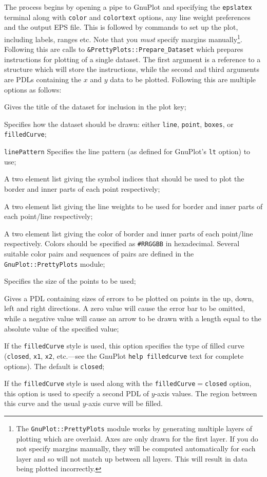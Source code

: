 The process begins by opening a pipe to {\sc GnuPlot} and specifying the {\tt epslatex} terminal along with {\tt color} and {\tt colortext} options, any line weight preferences and the output EPS file. This is followed by commands to set up the plot, including labels, ranges etc. Note that you \emph{must} specify margins manually\footnote{The {\tt GnuPlot::PrettyPlots} module works by generating multiple layers of plotting which are overlaid. Axes are only drawn for the first layer. If you do not specify margins manually, they will be computed automatically for each layer and so will not match up between all layers. This will result in data being plotted incorrectly.}. Following this are calls to {\tt \&PrettyPlots::Prepare\_Dataset} which prepares instructions for plotting of a single dataset. The first argument is a reference to a structure which will store the instructions, while the second and third arguments are PDLs containing the $x$ and $y$ data to be plotted. Following this are multiple options as follows:
\begin{description}
\item[{\tt title}] Gives the title of the dataset for inclusion in the plot key;
\item[{\tt style}] Specifies how the dataset should be drawn: either {\tt line}, {\tt point}, {\tt boxes}, or {\tt filledCurve};
\item{{\tt linePattern}} Specifies the line pattern (as defined for {\sc GnuPlot}'s {\tt lt} option) to use;
\item[{\tt symbol}] A two element list giving the symbol indices that should be used to plot the border and inner parts of each point respectively;
\item[{\tt weight}] A two element list giving the line weights to be used for border and inner parts of each point/line respectively;
\item[{\tt color}] A two element list giving the color of border and inner parts of each point/line respectively. Colors should be specified as {\tt \#RRGGBB} in hexadecimal. Several suitable color pairs and sequences of pairs are defined in the {\tt GnuPlot::PrettyPlots} module;
\item[{\tt pointSize}] Specifies the size of the points to be used;
\item[{\tt errorNNN}] Gives a PDL containing sizes of errors to be plotted on points in the up, down, left and right directions. A zero value will cause the error bar to be omitted, while a negative value will cause an arrow to be drawn with a length equal to the absolute value of the specified value;
\item[{\tt filledCurve}] If the {\tt filledCurve} style is used, this option specifies the type of filled curve ({\tt closed}, {\tt x1}, {\tt x2}, etc.---see the {\sc GnuPlot} {\tt help filledcurve} text for complete options). The default is {\tt closed};
\item[{\tt y2}] If the {\tt filledCurve} style is used along with the {\tt filledCurve}$=${\tt closed} option, this option is used to specify a second PDL of $y$-axis values. The region between this curve and the usual $y$-axis curve will be filled.
\end{description}
